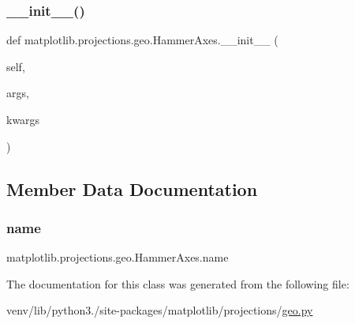 \subsubsection{\texorpdfstring{\+\_\+\+\_\+init\+\_\+\+\_\+()}{\_\_init\_\_()}}
{\footnotesize\ttfamily def matplotlib.\+projections.\+geo.\+Hammer\+Axes.\+\_\+\+\_\+init\+\_\+\+\_\+ (\begin{DoxyParamCaption}\item[{}]{self,  }\item[{}]{args,  }\item[{}]{kwargs }\end{DoxyParamCaption})}



\subsection{Member Data Documentation}
\mbox{\label{classmatplotlib_1_1projections_1_1geo_1_1HammerAxes_a2542a133597f433f01f8a3e935a524b2}} 
\subsubsection{\texorpdfstring{name}{name}}
{\footnotesize\ttfamily matplotlib.\+projections.\+geo.\+Hammer\+Axes.\+name\hspace{0.3cm}{\ttfamily [static]}}



The documentation for this class was generated from the following file\+:\begin{DoxyCompactItemize}
\item 
venv/lib/python3./site-\/packages/matplotlib/projections/\hyperlink{geo_8py}{geo.\+py}\end{DoxyCompactItemize}
